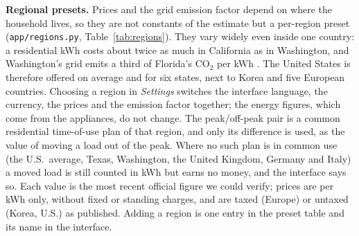 \documentclass[conference]{IEEEtran}
\begin{document}
\textbf{Regional presets.} Prices and the grid emission factor depend on where the household lives, so they are not constants of the estimate but a per-region preset (\texttt{app/regions.py}, Table~\ref{tab:regions}). They vary widely even inside one country: a residential kWh costs about twice as much in California as in Washington, and Washington's grid emits a third of Florida's CO$_2$ per kWh \cite{eia2026,egrid2023}. The United States is therefore offered on average and for six states, next to Korea and five European countries. Choosing a region in \emph{Settings} switches the interface language, the currency, the prices and the emission factor together; the energy figures, which come from the appliances, do not change. The peak/off-peak pair is a common residential time-of-use plan of that region, and only its difference is used, as the value of moving a load out of the peak. Where no such plan is in common use (the U.S.\ average, Texas, Washington, the United Kingdom, Germany and Italy) a moved load is still counted in kWh but earns no money, and the interface says so. Each value is the most recent official figure we could verify; prices are per kWh only, without fixed or standing charges, and are taxed (Europe) or untaxed (Korea, U.S.) as published. Adding a region is one entry in the preset table and its name in the interface.
\end{document}
